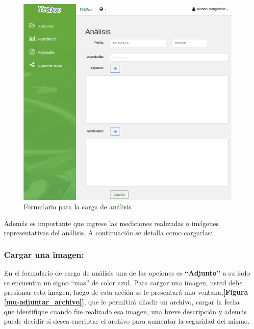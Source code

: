 
 
 \begin{figure}
 	\centering
 	\includegraphics[width=.8\textwidth]{img/manual_de_usuario/mu-cargar_analisis}
 	\caption{Formulario para la carga de análisis}
 	\label{mu-cargar_analisis}
 \end{figure}
 
 Además es importante que ingrese las mediciones realizadas o imágenes representativas del análisis. A continuación se detalla como cargarlas:
 
\subsubsection{Cargar una imagen:} 
 	
 	En el formulario de carga de análisis una de las opciones es \textbf{``Adjunto''} a su lado se encuentra  un signo ``mas'' de color azul. Para cargar una imagen, usted debe presionar esta imagen, luego de esta acción se le presentará una ventana,\textbf{[Figura \ref{mu-adjuntar_archivo}]}, que le permitirá añadir un archivo, cargar la fecha que identifique cuando fue realizado esa imagen, una breve descripción y además puede decidir si desea encriptar el archivo para aumentar la seguridad del mismo.
 	
